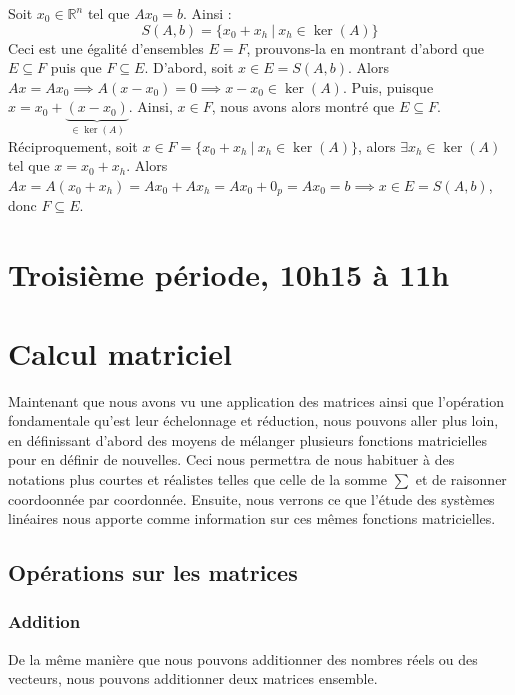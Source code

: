 \documentclass{article}
\newcommand{\R}{\mathbb{R}}
\begin{document}
\noindent
Soit $x_0 \in \R^n$ tel que $Ax_0 = b$. Ainsi :
$$
S(A,b) = \{x_0 + x_h \ | \ x_h \in \ker(A)\}
$$
Ceci est une égalité d'ensembles $E = F$, prouvons-la en montrant d'abord que $E \subseteq F$ puis que $F \subseteq E$. D'abord, soit $x \in E = S(A,b)$. Alors $Ax = Ax_0 \implies A(x-x_0) = 0 \implies x-x_0 \in \ker(A)$. Puis, puisque $x = x_0 + \underbrace{(x-x_0)}_{\in \ker(A)}$. Ainsi, $x \in F$, nous avons alors montré que $E \subseteq F$.\\
Réciproquement, soit $x \in F=\{x_0 + x_h \ | \ x_h \in \ker(A)\}$, alors $\exists x_h \in \ker(A)$ tel que $x = x_0 + x_h$. Alors $Ax = A(x_0 + x_h) = Ax_0 + Ax_h = Ax_0 + 0_p = Ax_0=b \implies x \in E = S(A,b)$, donc $F \subseteq E$.
\newpage

\section*{Troisième période, 10h15 à 11h}
\section{Calcul matriciel}
\noindent Maintenant que nous avons vu une application des matrices ainsi que l'opération fondamentale qu'est leur échelonnage et réduction, nous pouvons aller plus loin, en définissant d'abord des moyens de mélanger plusieurs fonctions matricielles pour en définir de nouvelles. Ceci nous permettra de nous habituer à des notations plus courtes et réalistes telles que celle de la somme $\sum$ et de raisonner coordoonnée par coordonnée. Ensuite, nous verrons ce que l'étude des systèmes linéaires nous apporte comme information sur ces mêmes fonctions matricielles.

\subsection{Opérations sur les matrices}

\subsubsection{Addition}
\noindent De la même manière que nous pouvons additionner des nombres réels ou des vecteurs, nous pouvons additionner deux matrices ensemble. \\
\end{document}

